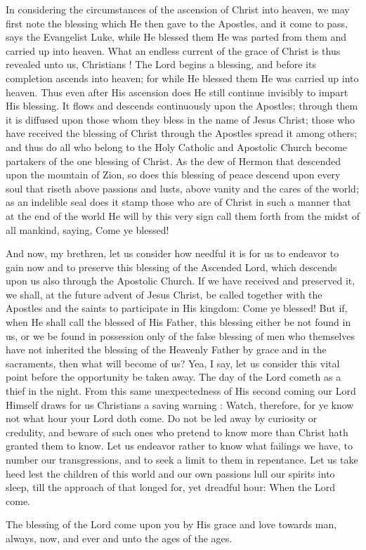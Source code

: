 In considering the circumstances of the ascension
of Christ into heaven, we may first note the 
blessing which He then gave to the Apostles,
and it come to pass, says the Evangelist Luke, 
while He blessed them He was parted from 
them and carried up into heaven. What an endless
current of the grace of Christ is thus revealed
unto us, Christians ! The Lord begins a 
blessing, and before its completion ascends into 
heaven; for while He blessed them He was carried
up into heaven. Thus even after His ascension
does He still continue invisibly to impart 
His blessing. It flows and descends continuously
upon the Apostles; through them it is diffused
upon those whom they bless in the name 
of Jesus Christ; those who have received the 
blessing of Christ through the Apostles spread 
it among others; and thus do all who belong to 
the Holy Catholic and Apostolic Church become 
partakers of the one blessing of Christ. As the 
dew of Hermon that descended upon the mountain
of Zion, so does this blessing of peace descend
upon every soul that riseth above passions 
and lusts, above vanity and the cares of the 
world; as an indelible seal does it stamp those 
who are of Christ in such a manner that at the 
end of the world He will by this very sign call 
them forth from the midst of all mankind, saying,
Come ye blessed! 

And now, my brethren, let us consider how
needful it is for us to endeavor to gain now and 
to preserve this blessing of the Ascended Lord, 
which descends upon us also through the Apostolic
Church. If we have received and preserved 
it, we shall, at the future advent of Jesus Christ, 
be called together with the Apostles and the 
saints to participate in His kingdom: Come ye 
blessed! But if, when He shall call the blessed 
of His Father, this blessing either be not found 
in us, or we be found in possession only of the 
false blessing of men who themselves have not 
inherited the blessing of the Heavenly Father 
by grace and in the sacraments, then what will 
become of us? Yea, I say, let us consider this 
vital point before the opportunity be taken away. 
The day of the Lord cometh as a thief in the 
night. From this same unexpectedness of His 
second coming our Lord Himself draws for us 
Christians a saving warning : Watch, therefore, 
for ye know not what hour your Lord doth come. 
Do not be led away by curiosity or credulity, 
and beware of such ones who pretend to know 
more than Christ hath granted them to know. 
Let us endeavor rather to know what failings we 
have, to number our transgressions, and to seek 
a limit to them in repentance. Let us take heed 
lest the children of this world and our own passions
lull our spirits into sleep, till the approach 
of that longed for, yet dreadful hour: When 
the Lord come. 

The blessing of the Lord come upon you by 
His grace and love towards man, always, now, 
and ever and unto the ages of the ages. 
